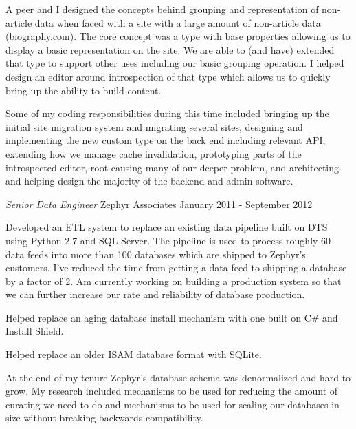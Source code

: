 \documentclass[margin]{res}
\begin{document}
\begin{resume}
                A peer and I designed the concepts behind grouping and representation of
                non-article data when faced with a site with a large amount of non-article
                data (biography.com). The core concept was a type with base properties
                allowing us to display a basic representation on the site. We are able to
                (and have) extended that type to support other uses including our basic
                grouping operation. I helped design an editor around introspection of that
                type which allows us to quickly bring up the ability to build content.

                Some of my coding responsibilities during this time included bringing
                up the initial site migration system and migrating several sites,
                designing and implementing the new custom type on the back end including relevant API,
                extending how we manage cache invalidation, prototyping parts of the introspected editor,
                root causing many of our deeper problem, and architecting and helping
                design the majority of the backend and admin software.

                {\sl\large Senior Data Engineer} Zephyr Associates \hfill January 2011 - September 2012

                Developed an ETL system to replace an existing data
                pipeline built on DTS using Python 2.7 and SQL Server. The
                pipeline is used to process roughly 60 data feeds into
                more than 100 databases which are shipped to Zephyr's
                customers. I've reduced the time from getting a data feed
                to shipping a database by a factor of 2. Am currently
                working on building a production system so that we can
                further increase our rate and reliability of database
                production.

                Helped replace an aging database install mechanism with
                one built on C\# and Install Shield.

                Helped replace an older ISAM database format with SQLite.

                At the end of my tenure Zephyr's database schema was
                denormalized and hard to grow. My research included
                mechanisms to be used for reducing the amount of
                curating we need to do and mechanisms to be used for
                scaling our databases in size without breaking backwards
                compatibility.


\end{resume}
\end{document}
